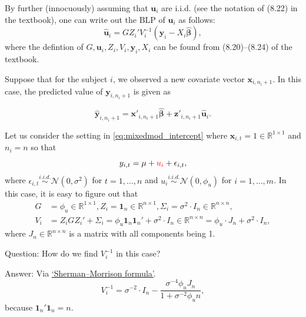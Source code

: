 \documentclass[ignorenonframetext,]{beamer}
\begin{document}
\begin{frame}[allowframebreaks]
\framebreak



By further (innocuously) assuming that $\bm{u}_i$ are i.i.d. (see the notation of (8.22) in the textbook), one can write out the BLP of $\bm{u}_i$ as follows:
$$
\hat{\bm{u}}_i=G Z_i'V_i^{-1}(\bm{y}_i-X_i\hat{\bm{\beta}}),
$$
where the defintion of $G, \bm{u}_i, Z_i, V_i, \bm{y}_i, X_i$ can be found from (8.20)--(8.24) of the textbook.

\vspace{8pt}

Suppose that for the subject $i$, we observed a new covariate vector $\bm{x}_{i,n_i+1}$. In this case, the predicted value of $\bm{y}_{i,n_i+1}$ is given as

$$
\hat{\bm{y}}_{i,n_i+1}= \bm{x}'_{i,n_i+1}\hat{\bm{\beta}} + \bm{z}'_{i,n_i+1}\hat{\bm{u}}_i.
$$

\framebreak

Let us consider the setting in \eqref{eq:mixedmod_intercept} where $\mathbf{x}_{i,t} = 1 \in \mathbb{R}^{1 \times 1}$ and $n_i=n$ so that
$$
y_{i,t} = \mu + {\color{red}u_i}+ \epsilon_{i,t},
$$
where $\epsilon_{i,t} \overset{i.i.d.}\sim \mathcal{N}(0, \sigma^2)$  for $t=1,\ldots, n$ and $u_i \overset{i.i.d.}\sim \mathcal{N}(0, \phi_u)$ for $i=1,\ldots, m$. In this case, it is easy to figure out that
$$
\begin{aligned}
G &= \phi_u \in \mathbb{R}^{1 \times 1}, Z_i = \bm{1}_{n} \in \mathbb{R}^{n \times 1}, {\Sigma}_i = \sigma^2 \cdot I_n \in \mathbb{R}^{n \times n}, \\
V_i &= Z_i G Z_i' + {\Sigma}_i = \phi_u \bm{1}_{n} \bm{1}_{n}' + \sigma^2 \cdot I_n \in \mathbb{R}^{n \times n} = \phi_u \cdot J_n + \sigma^2 \cdot I_n,
\end{aligned}
$$
where $J_n \in \mathbb{R}^{n \times n}$ is a matrix with all components being 1.

Question: How do we find $V_i^{-1}$ in this case?

Answer: Via \href{https://en.wikipedia.org/wiki/Sherman-Morrison_formula}{ `Sherman–Morrison formula'}.
$$
V_i^{-1}= \sigma^{-2} \cdot I_n - \frac{\sigma^{-4}\phi_u J_n}{1 + \sigma^{-2}\phi_u  n},
$$
because $ \bm{1}_{n} ' \bm{1}_{n} =n$.


\end{frame}
\end{document}
